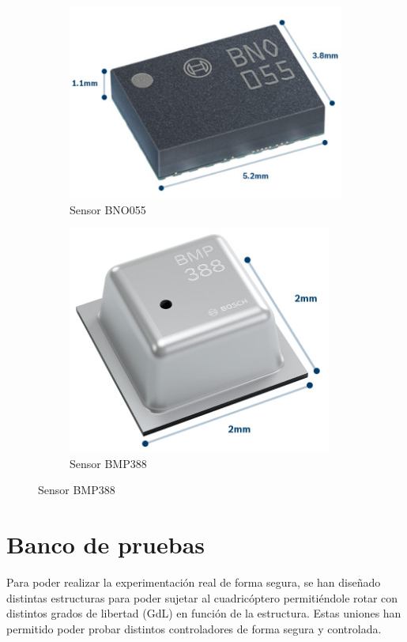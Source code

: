 	
\begin{figure}[htb!]
	\centering
	\begin{subfigure}{0.4\textwidth}
		\centering
		\includegraphics[height=0.5\textwidth]{hardware/bno055.jpeg}
		\caption{Sensor BNO055}
		\label{BNO055}
	\end{subfigure}
	\begin{subfigure}{0.4\textwidth}
		\centering
		\includegraphics[height=0.5\textwidth]{hardware/bmp388.jpeg}
		\caption{Sensor BMP388}
		\label{BMP388}
	\end{subfigure}
\end{figure}


 

\section{Banco de pruebas}
Para poder realizar la experimentación real de forma segura, se han diseñado distintas estructuras para poder sujetar al cuadricóptero permitiéndole rotar con distintos grados de libertad (GdL) en función de la estructura. Estas uniones han permitido poder probar distintos controladores de forma segura y controlada.


